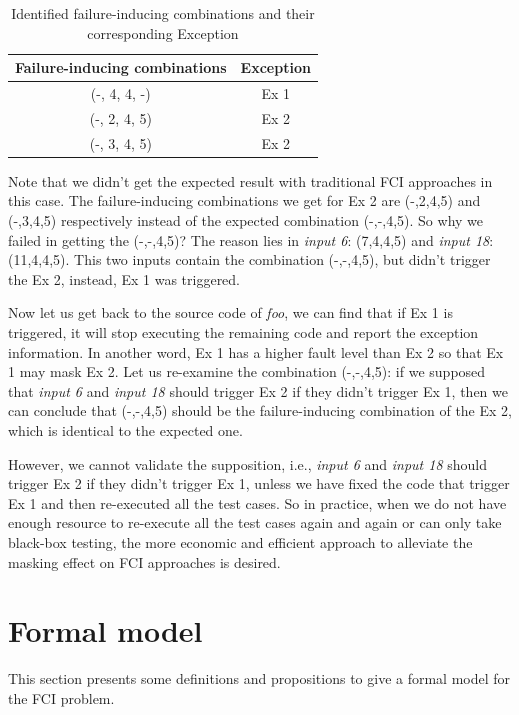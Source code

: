 \documentclass{sig-alternate}
\begin{document}
\begin{table}
\centering
\caption{Identified failure-inducing combinations and their corresponding Exception}
\label{identify-example}
\begin{tabular}{|c|c|} \hline
Failure-inducing combinations & Exception\\ \hline
(-, 4, 4, -) &  Ex 1\\ \hline
(-, 2, 4, 5) &  Ex 2\\ \hline
(-, 3, 4, 5) &  Ex 2\\ \hline
\hline\end{tabular}
\end{table}

Note that we didn't get the expected result with traditional FCI approaches in this case. The failure-inducing combinations we get for Ex 2 are (-,2,4,5) and (-,3,4,5) respectively instead of the expected combination (-,-,4,5). So why we failed in getting the (-,-,4,5)? The reason lies in \emph{input 6}: (7,4,4,5) and \emph{input 18}: (11,4,4,5). This two inputs contain the combination (-,-,4,5), but didn't trigger the Ex 2, instead,  Ex 1 was triggered.


Now let us get back to the source code of \emph{foo}, we can find that if Ex 1 is triggered, it will stop executing the remaining code and report the exception information. In another word, Ex 1 has a higher fault level than Ex 2 so that Ex 1 may mask Ex 2. Let us re-examine the combination (-,-,4,5): if we supposed that \emph{input 6} and \emph{input 18} should trigger Ex 2 if they didn't trigger Ex 1, then we can conclude that (-,-,4,5) should be the failure-inducing combination of the Ex 2, which is identical to the expected one.

However, we cannot validate the supposition, i.e., \emph{input 6} and \emph{input 18} should trigger Ex 2 if they didn't trigger Ex 1, unless we have fixed the code that trigger Ex 1 and then re-executed all the test cases. So in practice, when we do not have enough resource to re-execute all the test cases again and again or can only take black-box testing, the more economic and efficient approach to alleviate the masking effect on FCI approaches is desired.

\section{Formal model}
This section presents some definitions and propositions to give a formal model for the FCI problem.
\end{document}
